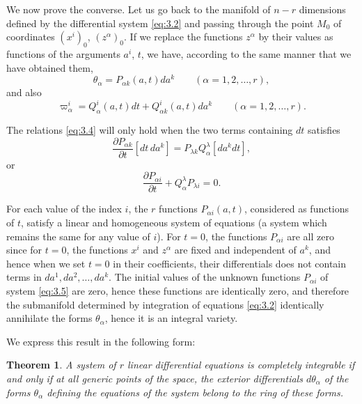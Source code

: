 \documentclass[leqno,11pt]{book}
\numberwithin{equation}{chapter}
\newcommand{\pd}{\partial}
\theoremstyle{shape1}
\newtheorem*{thm*}{\hspace{15pt}Theorem}
\theoremstyle{shape0}
\theoremstyle{shape2}
\theoremstyle{definition}
\begin{document}
\vspace{12pt}\fsec We now prove the converse. Let us go back to the manifold of $n-r$ dimensions defined by the differential system \eqref{eq:3.2} and passing through the point $M_{0}$ of coordinates $(x^{i})_{0}$, $(z^{\alpha})_{0}$. If we replace the functions $z^{\alpha}$ by their values as functions of the arguments $a^{i}$, $t$, we have, according to the same manner that we have obtained them,
\[
\theta_{\alpha}=P_{\alpha k}(a,t)da^{k}\qquad(\alpha=1,2,\dots,r),
\]
and also
\[
\varpi^{i}_{\alpha}=Q^{i}_{\alpha}(a,t)dt+Q^{i}_{\alpha k}(a,t)da^{k}\qquad(\alpha=1,2,\dots,r).
\]

The relations \eqref{eq:3.4} will only hold when the two terms containing $dt$ satisfies
\[
\frac{\pd P_{\alpha k}}{\pd t}[dt\,da^{k}]=P_{\lambda k}Q^{\lambda}_{\alpha}[da^{k}dt],
\]
or
\begin{equation}
  \label{eq:3.5}
  \frac{\pd P_{\alpha i}}{\pd t}+Q^{\lambda}_{\alpha}P_{\lambda i}=0.
\end{equation}

For each value of the index $i$, the $r$ functions $P_{\alpha i}(a,t)$, considered as functions of $t$, satisfy a linear and homogeneous system of equations (a system which remains the same for any value of $i$). For $t=0$, the functions $P_{\alpha i}$ are all zero since for $t=0$, the functions $x^{i}$ and $z^{\alpha}$ are fixed and independent of $a^{k}$, and hence when we set $t=0$ in their coefficients, their differentials does not contain terms in $da^{1},da^{2},\dots,da^{k}$. The initial values of the unknown functions $P_{\alpha i}$ of system \eqref{eq:3.5} are zero, hence these functions are identically zero, and therefore the submanifold determined by integration of equations \eqref{eq:3.2} identically annihilate the forms $\theta_{\alpha}$, hence it is an integral variety.

We express this result in the following form:
\begin{thm*}
  A system of $r$ linear differential equations is completely integrable if and only if at all generic points of the space, the exterior differentials $d\theta_{\alpha}$ of the forms $\theta_{\alpha}$ defining the equations of the system belong to the ring of these forms.
\end{thm*}
\end{document}
